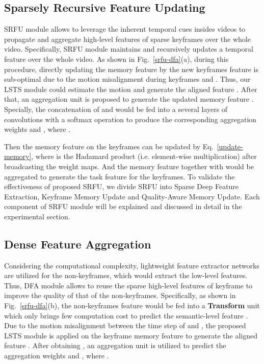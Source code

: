 \documentclass[runningheads]{llncs}
\begin{document}
\subsection{Sparsely Recursive Feature Updating}\label{subsec:SRFU}
SRFU module allows to leverage the inherent temporal cues insides videos to propagate and aggregate high-level features of sparse keyframes over the whole video.
Specifically, SRFU module maintains and recursively updates a temporal feature  over the whole video. As shown in Fig.~\ref{srfu-dfa}(a), during this procedure, directly updating the memory feature by the new keyframes feature  is sub-optimal due to the motion misalignment during keyframes  and . Thus, our LSTS module could estimate the motion and generate the aligned feature .
After that, an aggregation unit is proposed to generate the updated memory feature . 
Specially, the concatenation of  and  would be fed into a several layers of convolutions with a softmax operation to produce the corresponding aggregation weights  and , where .

Then the memory feature on the keyframes  can be updated by Eq.~\ref{update-memory}, where  is the Hadamard product (i.e. element-wise multiplication) after broadcasting the weight maps. And the memory feature  together with  would be aggregated to generate the task feature for the keyframes. To validate the effectiveness of proposed SRFU, we divide SRFU into Sparse Deep Feature Extraction, Keyframe Memory Update and Quality-Aware Memory Update. Each component of SRFU module will be explained and discussed in detail in the experimental section.

\subsection{Dense Feature Aggregation}\label{subsec:DFA}
Considering the computational complexity, lightweight feature extractor networks are utilized for the non-keyframes, which would extract the low-level features. 
Thus, DFA module allows to reuse the sparse high-level features of keyframe to improve the quality of that of the non-keyframes.
Specifically, as shown in Fig.~\ref{srfu-dfa}(b), the non-keyframes feature   would be fed into a \textbf{Transform} unit which only brings few computation cost to predict the semantic-level feature .
Due to the motion misalignment between the time step of  and , the proposed LSTS module is applied on the keyframe memory feature  to generate the aligned feature .
After obtaining , an aggregation unit is utilized to predict the aggregation weights  and , where .
\end{document}

